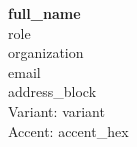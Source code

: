 \documentclass[9pt]{article}
\begin{document}
\raggedright
\textbf{\Large {{ full_name }}}\\
{{ role }}\\
{{ organization }}\\
{{ email }}\\
{{ address_block }}\\
Variant: {{ variant }}\\
Accent: {{ accent_hex }}\\
\cardiffqr[width=0.6in]
\end{document}
